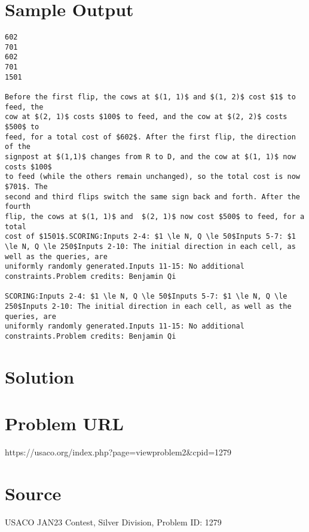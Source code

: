 \documentclass[12pt]{article}
\begin{document}
\section*{Sample Output}
\begin{verbatim}
602
701
602
701
1501

Before the first flip, the cows at $(1, 1)$ and $(1, 2)$ cost $1$ to feed, the
cow at $(2, 1)$ costs $100$ to feed, and the cow at $(2, 2)$ costs $500$ to
feed, for a total cost of $602$. After the first flip, the direction of the
signpost at $(1,1)$ changes from R to D, and the cow at $(1, 1)$ now costs $100$
to feed (while the others remain unchanged), so the total cost is now $701$. The
second and third flips switch the same sign back and forth. After the fourth
flip, the cows at $(1, 1)$ and  $(2, 1)$ now cost $500$ to feed, for a total
cost of $1501$.SCORING:Inputs 2-4: $1 \le N, Q \le 50$Inputs 5-7: $1 \le N, Q \le 250$Inputs 2-10: The initial direction in each cell, as well as the queries, are
uniformly randomly generated.Inputs 11-15: No additional constraints.Problem credits: Benjamin Qi

SCORING:Inputs 2-4: $1 \le N, Q \le 50$Inputs 5-7: $1 \le N, Q \le 250$Inputs 2-10: The initial direction in each cell, as well as the queries, are
uniformly randomly generated.Inputs 11-15: No additional constraints.Problem credits: Benjamin Qi
\end{verbatim}

\section*{Solution}


\section*{Problem URL}
https://usaco.org/index.php?page=viewproblem2&cpid=1279

\section*{Source}
USACO JAN23 Contest, Silver Division, Problem ID: 1279
\end{document}
